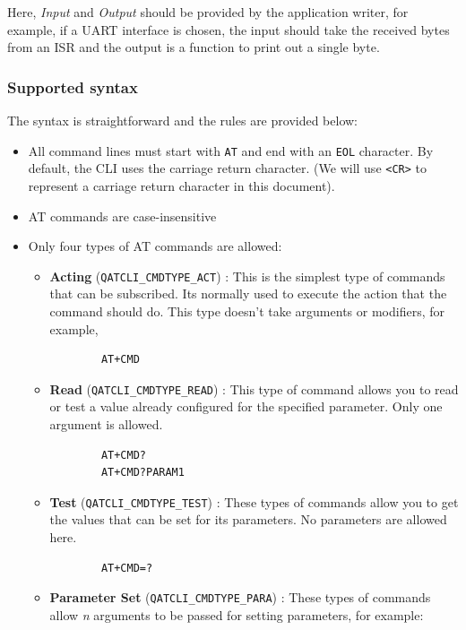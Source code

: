 \documentclass{article}
\begin{document}
\begin{tcolorbox}
\HandRight Here, \textit{Input} and \textit{Output} should be provided by the application writer, for example, if a UART interface is chosen, the input should take the received bytes from an ISR and the output is a function to print out a single byte.
\end{tcolorbox}

\subsubsection{Supported syntax} \label{atsyntax}

The syntax is straightforward and the rules are provided below:

\begin{itemize}
    \item All command lines must start with \lstinline{AT} and end with an \lstinline{EOL} character. By default, the CLI uses the carriage return character. (We will use \lstinline{<CR>} to represent a carriage return character in this document).
    \item AT commands are case-insensitive 
    \item Only four types of AT commands are allowed:
    \begin{itemize}
        \item \textbf{Acting} (\lstinline{QATCLI_CMDTYPE_ACT}) : This is the simplest type of commands that can be subscribed. Its normally used to execute the action that the command should do. This type doesn't take arguments or modifiers, for example,
        \begin{lstlisting}
        AT+CMD
        \end{lstlisting}
        \item \textbf{Read} (\lstinline{QATCLI_CMDTYPE_READ}) : This type of command allows you to read or test a value already configured for the specified parameter. Only one argument is allowed.
        \begin{lstlisting}
        AT+CMD?
        AT+CMD?PARAM1
        \end{lstlisting}        
        \item \textbf{Test} (\lstinline{QATCLI_CMDTYPE_TEST}) : These types of commands allow you to get the values that can be set for its parameters. No parameters are allowed here.
        \begin{lstlisting}
        AT+CMD=?
        \end{lstlisting}
        \item \textbf{Parameter Set} (\lstinline{QATCLI_CMDTYPE_PARA}) : These types of commands allow \textit{n} arguments to be passed for setting parameters, for example:

\end{itemize}
\end{itemize}
\end{document}
